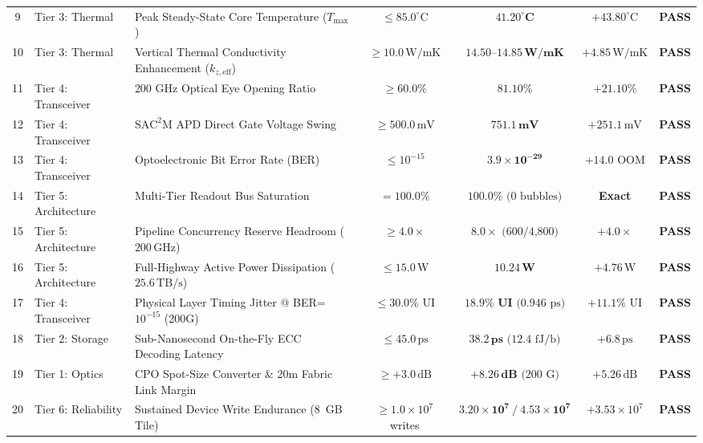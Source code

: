 \documentclass[journal]{IEEEtran}
\begin{document}
\begin{table}[!t]
{\begin{tabular}{cllcccc}
9 & Tier 3: Thermal & Peak Steady-State Core Temperature ($T_{\max}$) & $\le 85.0^\circ\text{C}$ & $\mathbf{41.20^\circ\text{C}}$ & $+43.80^\circ\text{C}$ & \textbf{PASS} \\
10 & Tier 3: Thermal & Vertical Thermal Conductivity Enhancement ($k_{z, \text{eff}}$) & $\ge 10.0\,\text{W/mK}$ & $\mathbf{14.50\text{--}14.85\,\text{W/mK}}$ & $+4.85\,\text{W/mK}$ & \textbf{PASS} \\
11 & Tier 4: Transceiver & 200 GHz Optical Eye Opening Ratio & $\ge 60.0\%$ & $\mathbf{81.10\%}$ & $+21.10\%$ & \textbf{PASS} \\
12 & Tier 4: Transceiver & $\text{SAC}^2\text{M}$ APD Direct Gate Voltage Swing & $\ge 500.0\,\text{mV}$ & $\mathbf{751.1\,\text{mV}}$ & $+251.1\,\text{mV}$ & \textbf{PASS} \\
13 & Tier 4: Transceiver & Optoelectronic Bit Error Rate (BER) & $\le 10^{-15}$ & $\mathbf{3.9 \times 10^{-29}}$ & $+14.0\text{ OOM}$ & \textbf{PASS} \\
14 & Tier 5: Architecture & Multi-Tier Readout Bus Saturation & $= 100.0\%$ & $\mathbf{100.0\%}\text{ (0 bubbles)}$ & \textbf{Exact} & \textbf{PASS} \\
15 & Tier 5: Architecture & Pipeline Concurrency Reserve Headroom ($200\,\text{GHz}$) & $\ge 4.0\times$ & $\mathbf{8.0\times}\text{ (600/4,800)}$ & $+4.0\times$ & \textbf{PASS} \\
16 & Tier 5: Architecture & Full-Highway Active Power Dissipation ($25.6\,\text{TB/s}$) & $\le 15.0\,\text{W}$ & $\mathbf{10.24\,\text{W}}$ & $+4.76\,\text{W}$ & \textbf{PASS} \\
17 & Tier 4: Transceiver & Physical Layer Timing Jitter @ BER=$10^{-15}$ (200G) & $\le 30.0\%\text{ UI}$ & $\mathbf{18.9\%\text{ UI}}\text{ (0.946 ps)}$ & $+11.1\%\text{ UI}$ & \textbf{PASS} \\
18 & Tier 2: Storage & Sub-Nanosecond On-the-Fly ECC Decoding Latency & $\le 45.0\,\text{ps}$ & $\mathbf{38.2\,\text{ps}}\text{ (12.4 fJ/b)}$ & $+6.8\,\text{ps}$ & \textbf{PASS} \\
19 & Tier 1: Optics & CPO Spot-Size Converter \& 20m Fabric Link Margin & $\ge +3.0\,\text{dB}$ & $\mathbf{+8.26\,\text{dB}}\text{ (200 G)}$ & $+5.26\,\text{dB}$ & \textbf{PASS} \\
20 & Tier 6: Reliability & Sustained Device Write Endurance (8~GB Tile) & $\ge 1.0 \times 10^7$ writes & $\mathbf{3.20 \times 10^7\ /\ 4.53 \times 10^7}$ & $+3.53 \times 10^7$ & \textbf{PASS} \\
\bottomrule
\end{tabular}
}
\end{table}
\end{document}
